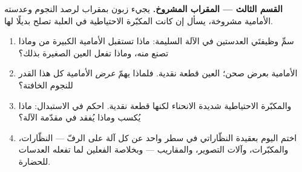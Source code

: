 \begin{problem}
\medskip\noindent\textbf{القسم الثالث --- المقراب المشروخ.}
يجيء زبون بمقراب لرصد النجوم وعدسته الأمامية مشروخة، يسأل إن
كانت المكبّرة الاحتياطية في العلبة تصلح بديلًا لها.
\begin{enumerate}[resume]
  \item سمِّ وظيفتَي العدستين في الآلة السليمة: ماذا تستقبل
         الأمامية الكبيرة من  وماذا تصنع منه، وماذا
        تفعل  العين الصغيرة بذلك؟
  \item {} الأمامية بعرض صحن؛  العين  قطعة
        نقدية. فلماذا يهمّ \emph{عرض}  الأمامية كل هذا
        القدر للنجوم الخافتة؟
  \item والمكبّرة الاحتياطية شديدة الانحناء لكنها  قطعة
        نقدية. احكم في الاستبدال: ماذا يُكسب وماذا يُفقد في
        مقدّمة الآلة؟
  \item اختم اليوم بعقيدة النظّاراتي في سطر واحد عن كل آلة
        على الرفّ --- النظّارات، والمكبّرات، وآلات التصوير،
        والمقاريب --- وبخلاصة الفعلين لما تفعله العدسات
        للحضارة.
\end{enumerate}
\end{problem}
